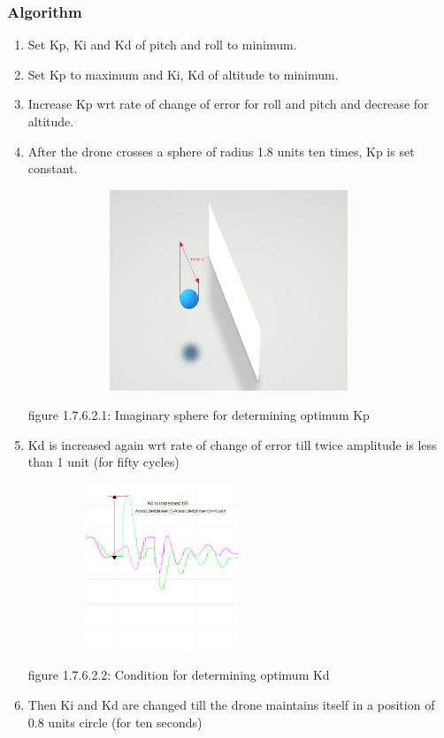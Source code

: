 \documentclass[a4paper,12pt,oneside]{book}
\begin{document}
\subsubsection{Algorithm}
\begin{enumerate}
     
\item Set Kp, Ki and Kd of pitch and roll to minimum. 
\item Set Kp to maximum and Ki, Kd of altitude to minimum.
\item Increase Kp wrt rate of change of error for roll and pitch and decrease for altitude.
\item After the drone crosses a sphere of radius 1.8 units ten times, Kp is set constant.

\includegraphics[width = 12cm , height= 6cm]{Capture.png}
\begin{center}
    figure 1.7.6.2.1: Imaginary sphere for determining optimum Kp
\end{center}

\item Kd is increased again wrt rate of change of error till twice amplitude is less than 1 unit (for fifty cycles)

\includegraphics[width = 8cm , height= 5cm]{Autotune_iteration_1_e1.png}
\begin{center}
    figure 1.7.6.2.2: Condition for determining optimum Kd
\end{center}

\item Then Ki and Kd are changed till the drone maintains itself in a position of 0.8 units circle (for ten seconds)
\end{enumerate}
\end{document}
